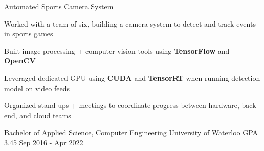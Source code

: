 \documentclass[11pt, a4paper]{awesome-cv}
\begin{document}
\begin{siderules2}
\begin{cventries}
    \cventry
        {\textit{}}
        {Automated Sports Camera System}
        {}
        {}
        {
          \begin{cvitems}
            \item {Worked with a team of six, building a camera system to detect and track events in sports games}
            \item {Built image processing + computer vision tools using \textbf{TensorFlow} and \textbf{OpenCV}}
            \item {Leveraged dedicated GPU using \textbf{CUDA} and \textbf{TensorRT} when running detection model on video feeds}
            \item {Organized stand-ups + meetings to coordinate progress between hardware, back-end, and cloud teams}
          \end{cvitems}
        }
\end{cventries}
\end{siderules2}
\begin{siderules3}
\begin{cventries}
    \education
    {\fontsize{11pt}{1.3em}\bodyfont\upshape\color{text}\selectfont Bachelor of Applied Science, Computer Engineering}
    {University of Waterloo}
    {GPA 3.45}
    {Sep 2016 - Apr 2022}
    {
      \begin{cvitems}
      \end{cvitems}
    }
\end{cventries}
\end{siderules3}
\end{document}
